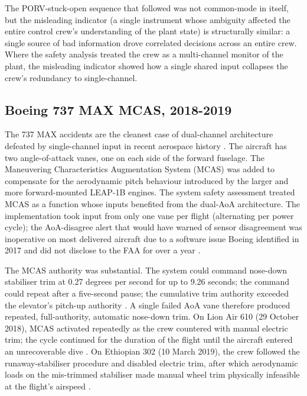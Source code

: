 The PORV-stuck-open sequence that followed was not common-mode in itself, but the misleading indicator (a single instrument whose ambiguity affected the entire control crew's understanding of the plant state) is structurally similar: a single source of bad information drove correlated decisions across an entire crew. Where the safety analysis treated the crew as a multi-channel monitor of the plant, the misleading indicator showed how a single shared input collapses the crew's redundancy to single-channel.

\subsection*{Boeing 737 MAX MCAS, 2018-2019}

The 737 MAX accidents are the cleanest case of dual-channel architecture defeated by single-channel input in recent aerospace history \cite{acc:house-737max-2020}. The aircraft has two angle-of-attack vanes, one on each side of the forward fuselage. The Maneuvering Characteristics Augmentation System (MCAS) was added to compensate for the aerodynamic pitch behaviour introduced by the larger and more forward-mounted LEAP-1B engines. The system safety assessment treated MCAS as a function whose inputs benefited from the dual-AoA architecture. The implementation took input from only one vane per flight (alternating per power cycle); the AoA-disagree alert that would have warned of sensor disagreement was inoperative on most delivered aircraft due to a software issue Boeing identified in 2017 and did not disclose to the FAA for over a year \cite{acc:house-737max-2020}.

The MCAS authority was substantial. The system could command nose-down stabiliser trim at 0.27 degrees per second for up to 9.26 seconds; the command could repeat after a five-second pause; the cumulative trim authority exceeded the elevator's pitch-up authority \cite{acc:house-737max-2020}. A single failed AoA vane therefore produced repeated, full-authority, automatic nose-down trim. On Lion Air 610 (29 October 2018), MCAS activated repeatedly as the crew countered with manual electric trim; the cycle continued for the duration of the flight until the aircraft entered an unrecoverable dive \cite{acc:knkt-lion-air-610-2019}. On Ethiopian 302 (10 March 2019), the crew followed the runaway-stabiliser procedure and disabled electric trim, after which aerodynamic loads on the mis-trimmed stabiliser made manual wheel trim physically infeasible at the flight's airspeed \cite{acc:ecaa-et302-2022}.

